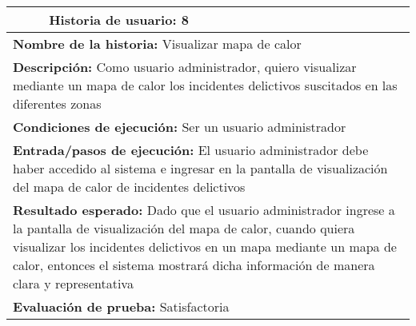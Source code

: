 \begin{longtable}{|p{6.7cm}|p{6.7cm}|}
    \hline
    \endlastfoot
    \multicolumn{1}{|p{6.7cm}|}{\textbf{Número} 8 } & \multicolumn{1}{|p{6.7cm}|}{\textbf{Historia de usuario:} 8}                                                                                                                                                                                                                  \\
    \hline
    \multicolumn{2}{|p{13.4cm}|}{\textbf{Nombre de la historia:} Visualizar mapa de calor }                                                                                                                                                                                                                                         \\
    \hline
    \multicolumn{2}{|p{13.4cm}|}{\textbf{Descripción:} Como usuario administrador, quiero visualizar mediante un mapa de calor los incidentes delictivos suscitados en las diferentes zonas}                                                                                                                                        \\
    \hline
    \multicolumn{2}{|p{13.4cm}|}{\textbf{Condiciones de ejecución:} Ser un usuario administrador}                                                                                                                                                                                                                                   \\
    \hline
    \multicolumn{2}{|p{13.4cm}|}{\textbf{Entrada/pasos de ejecución:} El usuario administrador debe haber accedido al sistema e ingresar en la pantalla de visualización del mapa de calor de incidentes delictivos}                                                                                                                \\
    \hline
    \multicolumn{2}{|p{13.4cm}|}{\textbf{Resultado esperado:} Dado que el usuario administrador ingrese a la pantalla de visualización del mapa de calor, cuando quiera visualizar los incidentes delictivos en un mapa mediante un mapa de calor, entonces el sistema mostrará dicha información de manera clara y representativa} \\
    \hline
    \multicolumn{2}{|p{13.4cm}|}{\textbf{Evaluación de prueba:} Satisfactoria}                                                                                                                                                                                                                                                      \\
    \hline
\end{longtable}


